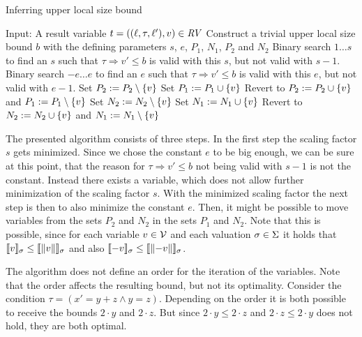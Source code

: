 \begin{algorithm}
\caption{Inferring upper local size bound}\label{lsb_algorithm}
\begin{algorithmic}[1]
  \State Input: A result variable $t = ((\ell,\tau,\ell'),v) \in \mathit{RV}$
  \State Construct a trivial upper local size bound $b$ with the defining parameters $s$, $e$, $P_1$, $N_1$, $P_2$ and $N_2$
  \State Binary search $1 \dots s$ to find an $s$ such that $\tau \Rightarrow v' \leq b$ is valid with this $s$, but not valid with $s-1$.
  \State Binary search $-e \dots e$ to find an $e$ such that $\tau \Rightarrow v' \leq b$ is valid with this $e$, but not valid with $e-1$.
    \State Set $P_2 := P_2 \setminus \lbrace v \rbrace$
      \State Set $P_1 := P_1 \cup \lbrace v \rbrace$
        \State Revert to $P_2 := P_2 \cup \lbrace v \rbrace$ and $P_1 := P_1 \setminus \lbrace v \rbrace$
      \EndIf
    \EndIf
    \State Set $N_2 := N_2 \setminus \lbrace v \rbrace$
      \State Set $N_1 := N_1 \cup \lbrace v \rbrace$
        \State Revert to $N_2 := N_2 \cup \lbrace v \rbrace$ and $N_1 := N_1 \setminus \lbrace v \rbrace$
      \EndIf
    \EndIf
  \EndFor
\end{algorithmic}
\end{algorithm}

The presented algorithm consists of three steps.
In the first step the scaling factor $s$ gets minimized.
Since we chose the constant $e$ to be big enough, we can be sure at this point, that the reason for $\tau \Rightarrow v' \leq b$ not being valid with $s-1$ is not the constant.
Instead there exists a variable, which does not allow further minimization of the scaling factor $s$.
With the minimized scaling factor the next step is then to also minimize the constant $e$.
Then, it might be possible to move variables from the sets $P_2$ and $N_2$ in the sets $P_1$ and $N_2$.
Note that this is possible, since for each variable $v \in \mathcal{V}$ and each valuation $\sigma \in \Sigma$ it holds that $\llbracket v \rrbracket_{\sigma} \leq \llbracket \left\Vert v\right\Vert \rrbracket_{\sigma}$ and also $\llbracket -v \rrbracket_{\sigma} \leq \llbracket \left\Vert-v\right\Vert \rrbracket_{\sigma}$.

The algorithm does not define an order for the iteration of the variables.
Note that the order affects the resulting bound, but not its optimality.
Consider the condition $\tau = (x' = y + z \wedge y = z)$.
Depending on the order it is both possible to receive the bounds $2 \cdot y$ and $2 \cdot z$.
But since $2 \cdot y \leq 2 \cdot z$ and $2 \cdot z \leq 2 \cdot y$ does not hold, they are both optimal.

